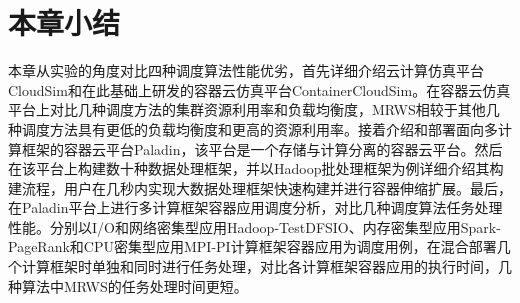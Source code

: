 \section{本章小结}
本章从实验的角度对比四种调度算法性能优劣，首先详细介绍云计算仿真平台CloudSim和在此基础上研发的容器云仿真平台ContainerCloudSim。在容器云仿真平台上对比几种调度方法的集群资源利用率和负载均衡度，MRWS相较于其他几种调度方法具有更低的负载均衡度和更高的资源利用率。接着介绍和部署面向多计算框架的容器云平台Paladin，该平台是一个存储与计算分离的容器云平台。然后在该平台上构建数十种数据处理框架，并以Hadoop批处理框架为例详细介绍其构建流程，用户在几秒内实现大数据处理框架快速构建并进行容器伸缩扩展。最后，在Paladin平台上进行多计算框架容器应用调度分析，对比几种调度算法任务处理性能。分别以I/O和网络密集型应用Hadoop-TestDFSIO、内存密集型应用Spark-PageRank和CPU密集型应用MPI-PI计算框架容器应用为调度用例，在混合部署几个计算框架时单独和同时进行任务处理，对比各计算框架容器应用的执行时间，几种算法中MRWS的任务处理时间更短。



















